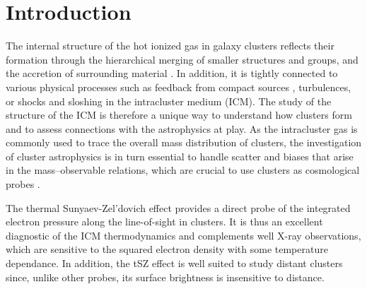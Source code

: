 \documentclass[twocolumn,traditabstract]{aa}
\begin{document}
\section{Introduction}
The internal structure of the hot ionized gas in galaxy clusters reflects their formation through the hierarchical merging of smaller structures and groups, and the accretion of surrounding material \citep[e.g.][and references therein]{Kravtsov2012}. In addition, it is tightly connected to various physical processes such as feedback from compact sources \citep[e.g.][]{Fabian2012}, turbulences, or shocks and sloshing \citep[e.g.][]{Markevitch2007} in the intracluster medium (ICM). The study of the structure of the ICM is therefore a unique way to understand how clusters form and to assess connections with the astrophysics at play. As the intracluster gas is commonly used to trace the overall mass distribution of clusters, the investigation of cluster astrophysics is in turn essential to handle scatter and biases that arise in the mass--observable relations, which are crucial to use clusters as cosmological probes \citep[see e.g.][for a review]{Allen2011}.

The thermal Sunyaev-Zel'dovich \citep[tSZ,][]{Sunyaev1972} effect provides a direct probe of the integrated electron pressure along the line-of-sight in clusters. It is thus an excellent diagnostic of the ICM thermodynamics and complements well X-ray observations, which are sensitive to the squared electron density with some temperature dependance. In addition, the tSZ effect is well suited to study distant clusters since, unlike other probes, its surface brightness is insensitive to distance.
\end{document}
